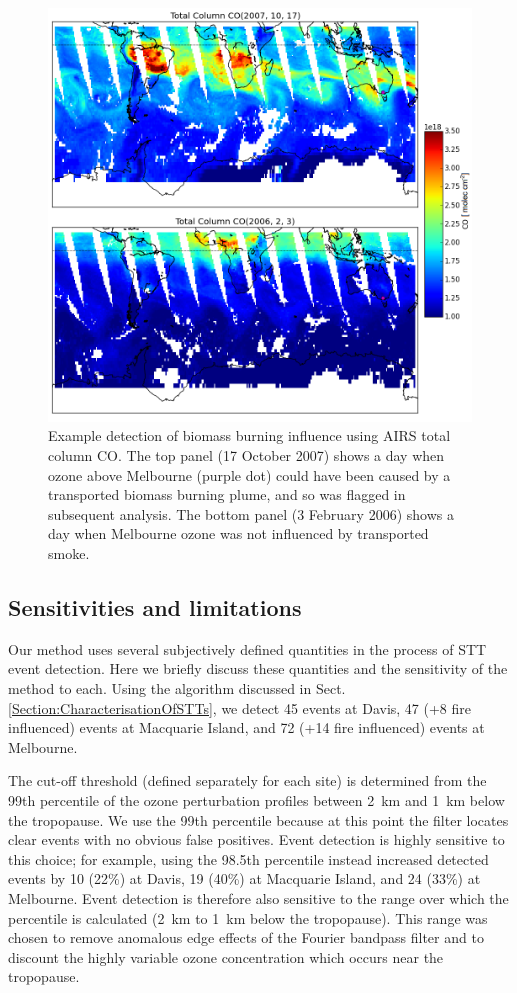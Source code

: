 \documentclass[acp, manuscript]{copernicus} %
\begin{document}
    \begin{figure}[t]
      \includegraphics[width=12cm]{figures/AIRS_compare.png}
      \caption{ %
	Example detection of biomass burning influence using AIRS total column CO. 
	The top panel (17 October 2007) shows a day when ozone above Melbourne (purple dot) could have been caused by a transported biomass burning plume, and so was flagged in subsequent analysis.
	The bottom panel (3 February 2006) shows a day when Melbourne ozone was not influenced by transported smoke.
	}
      \label{fig:excludedeg}
    \end{figure}

  \subsection{Sensitivities and limitations}
  \label{sec:sensitivity}
    Our method uses several subjectively defined quantities in the process of STT event detection.
    Here we briefly discuss these quantities and the sensitivity of the method to each.
    Using the algorithm discussed in Sect. \ref{Section:CharacterisationOfSTTs}, we detect 45 events at Davis, 47 (+8 fire influenced) events at Macquarie Island, and 72 (+14 fire influenced) events at Melbourne.

    The cut-off threshold (defined separately for each site) is determined from the 99th percentile of the ozone perturbation profiles between 2~km and 1~km below the tropopause.
    We use the 99th percentile because at this point the filter locates clear events with no obvious false positives.
    Event detection is highly sensitive to this choice; for example, using the 98.5th percentile instead increased detected events by 10 (22\%) at Davis, 19 (40\%) at Macquarie Island, and 24 (33\%) at Melbourne.
    Event detection is therefore also sensitive to the range over which the percentile is calculated (2~km to 1~km below the tropopause).
    This range was chosen to remove anomalous edge effects of the Fourier bandpass filter and to discount the highly variable ozone concentration which occurs near the tropopause.
\end{document}
